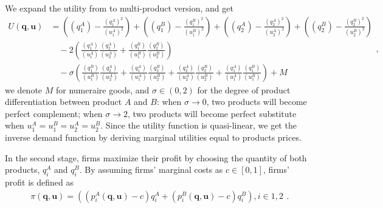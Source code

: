 \documentclass[12pt]{article}
\renewcommand{\vec}[1]{\mathbf{#1}}
\begin{document}
We expand the utility from \textcite{symeonidis_comparing_2003} to multi-product version, and get
\begin{equation}
    \begin{aligned}
        U (\mathbf{q}, \mathbf{u}) & = \left( (q_1^A) -\frac{(q_1^A)^2}{(u_1^A)^2} \right) + \left( (q_1^B) -\frac{(q_1^B)^2}{(u_1^B)^2} \right) + \left( (q_2^A) -\frac{(q_2^A)^2}{(u_2^A)^2} \right) + \left( (q_2^B) -\frac{(q_2^B)^2}{(u_2^B)^2} \right)\\
        &  \quad - 2 \left( \frac{(q_1^A)}{(u_1^A)} \frac{(q_2^A)}{(u_2^A)} + \frac{(q_1^B)}{(u_1^B)}  \frac{(q_2^B)}{(u_2^B)}\right)\\
        &  \quad - \sigma \left( \frac{(q_1^B)}{(u_1^B)} \frac{(q_2^A)}{(u_2^A)} + \frac{(q_1^A)}{(u_1^A)}  \frac{(q_2^B)}{(u_2^B)} + \frac{(q_2^A)}{(u_2^A)}  \frac{(q_2^B)}{(u_2^B)} + \frac{(q_1^A)}{(u_1^A)} \frac{(q_1^B)}{(u_1^B)} \right) + M
    \end{aligned},
\end{equation}
we denote $M$ for numeraire goods, and $\sigma \in (0,2)$ for the degree of product differentiation between product $A$ and $B$: when $\sigma \rightarrow 0$, two products will become perfect complement; when $\sigma \rightarrow 2$, two products will become perfect substitute when $u_1^A=u_1^B=u_2^A=u_2^B$. Since the utility function is quasi-linear, we get the inverse demand function by deriving marginal utilities equal to products prices.

In the second stage, firms maximize their profit by choosing the quantity of both products, $q_i^A$ and $q_i^B$.
By assuming firms' marginal costs as $c \in [0,1]$, firms' profit is defined as
\begin{equation}
    \begin{aligned}
        \pi (\vec{q}, \vec{u}) = \left( \left(p_i^A(\vec{q}, \vec{u})-c\right)q_i^A +  \left(p_i^B(\vec{q}, \vec{u})-c\right)q_i^B \right),i \in {1,2}
    \end{aligned}.
\end{equation}
\end{document}
